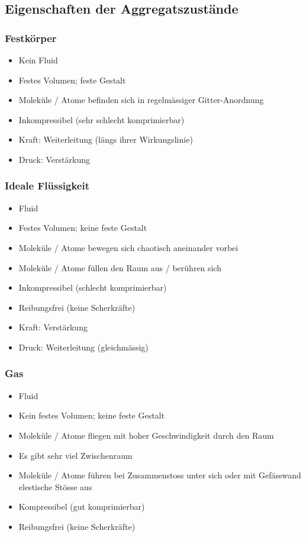 \subsection{Eigenschaften der Aggregatszustände}

\subsubsection{Festkörper}

\begin{itemize}
	\item Kein Fluid
	\item Festes Volumen; feste Gestalt
	\item Moleküle / Atome befinden sich in regelmässiger Gitter-Anordnung
	\item Inkompressibel (sehr schlecht komprimierbar)
	\item Kraft: Weiterleitung (längs ihrer Wirkungslinie)
	\item Druck: Verstärkung 
\end{itemize}


\subsubsection{Ideale Flüssigkeit}

\begin{itemize}
	\item Fluid
	\item Festes Volumen; keine feste Gestalt
	\item Moleküle / Atome bewegen sich chaotisch aneinander vorbei
	\item Moleküle / Atome füllen den Raum aus / berühren sich
	\item Inkompressibel (schlecht komprimierbar)
	\item Reibungsfrei (keine Scherkräfte)
	\item Kraft: Verstärkung
	\item Druck: Weiterleitung (gleichmässig)
\end{itemize}


\subsubsection{Gas}

\begin{itemize}
	\item Fluid
	\item Kein festes Volumen; keine feste Gestalt
	\item Moleküle / Atome fliegen mit hoher Geschwindigkeit durch den Raum
	\item Es gibt sehr viel Zwischenraum 
	\item Moleküle / Atome führen bei Zusammenstoss unter sich oder mit Gefässwand elestische Stösse aus
	\item Kompressibel (gut komprimierbar)
	\item Reibungsfrei (keine Scherkräfte)
\end{itemize}

